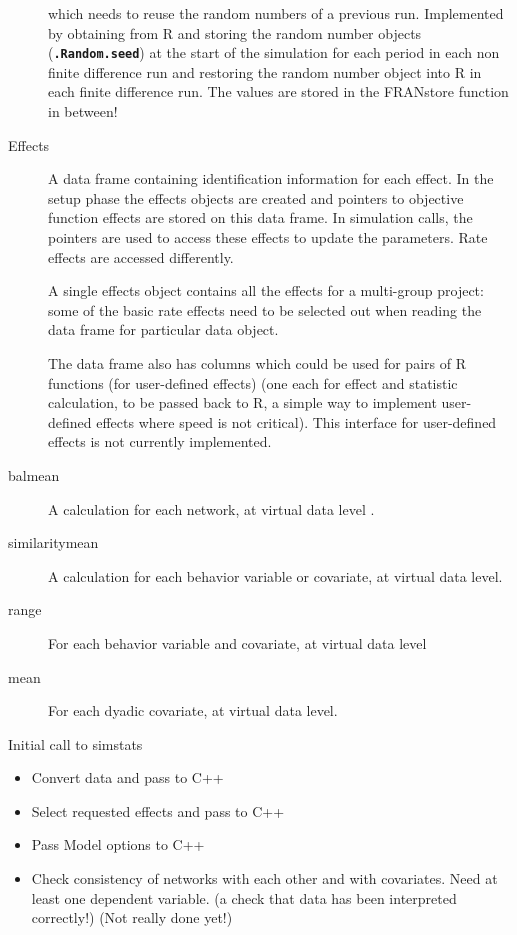 \documentclass[12pt,a4paper]{article}
\makeatletter
\renewcommand{\=}{\,=\,}
\newcommand{\+}{\,+\,}
\newcommand{\nm}[1]{\textsf{\small #1}}
\newcommand{\R}{{\sf R }}
\newcommand{\sfn}[1]{\textbf{\texttt{#1}}}
\renewcommand{\section}{\@startsection{section}{1}
                {0pt}{\baselineskip}{0.5\baselineskip}
                {\centering\sffamily} }
\makeatother
\begin{document}
\begin{description}
  which needs to reuse the random numbers of a previous run. Implemented by
  obtaining from \R and storing the random number objects (\sfn{.Random.seed})
  at the start of the simulation for each period in each non finite difference
  run and restoring the random number object into \R in each finite difference
  run. The values are stored in the \nm{FRANstore} function in between!
\item [Effects] A data frame containing identification information for
  each effect. In the setup phase the effects objects are created and pointers
  to objective function effects are stored on this data frame. In simulation
  calls, the pointers are used to access these effects to update the
  parameters. Rate effects are accessed differently.

  A single effects object contains all the effects for a multi-group project:
  some of the basic rate effects need to be selected out when reading the data
  frame for particular data object.

  The data frame also has columns which could be used for pairs of R functions
  (for user-defined effects) (one each for effect and statistic calculation, to
  be passed back to R, a simple way to implement user-defined effects where
  speed is not critical). This interface for user-defined effects is not
  currently implemented.
\item[balmean] A calculation for each network, at virtual data level .
\item[similaritymean] A calculation for each behavior variable or covariate, at
  virtual data level.
\item[range] For each behavior variable and covariate, at virtual data level
\item[mean] For each dyadic covariate, at virtual data level.
\end{description}
\section{Initial call to simstats}
\begin{itemize}
\item Convert data and pass to C++
\item Select requested effects and pass to C++
\item Pass Model options to C++
\item Check consistency of networks with each other and with covariates. Need at
  least one dependent variable. (a check that data has been interpreted
  correctly!) (Not really done yet!)
\end{itemize}
\end{document}

